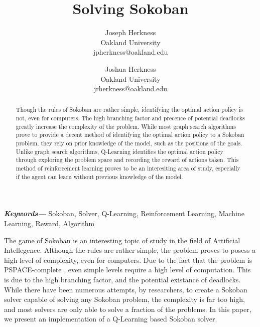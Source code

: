 \documentclass[times, 10pt,twocolumn]{article}
\begin{document}
\title{Solving Sokoban}

\author{
Joseph Herkness\\
Oakland University\\
jpherkness@oakland.edu\\
\and
Joshua Herkness\\
Oakland University\\
jrherkness@oakland.edu\\
}

\maketitle
\thispagestyle{empty}

\begin{abstract}
Though the rules of Sokoban are rather simple, identifying the optimal action policy is not, even for computers. The high branching factor and precence of potential deadlocks greatly increase the complexity of the problem. While most graph search algorithms prove to provide a decent method of identifying the optimal action policy to a Sokoban problem, they rely on prior knowledge of the model, such as the positions of the goals. Unlike graph search algorithms, Q-Learning identifies the optimal action policy through exploring the problem space and recording the reward of actions taken. This method of reinforcement learning proves to be an interesiting area of study, especially if the agent can learn without previous knowledge of the model.
\end{abstract}

\providecommand{\keywords}[1]{\textbf{\textit{Keywords---}} #1}
\keywords{Sokoban, Solver, Q-Learning, Reinforcement Learning, Machine Learning, Reward, Algorithm}


The game of Sokoban is an interesting topic of study in the field of Artificial Intellegence. Although the rules are rather simple, the problem proves to posess a high level of complexity, even for computers. Due to the fact that the problem is PSPACE-complete \cite{Pspace-complete97sokobanis}, even simple levels require a high level of computation. This is due to the high branching factor, and the potential existance of deadlocks. While there have been numerous attempts, by researchers, to create a Sokoban solver capable of solving any Sokoban problem, the complexity is far too high, and most solvers are only able to solve a fraction of the problems. In this paper, we present an implementation of a Q-Learning based Sokoban solver.
\end{document}
